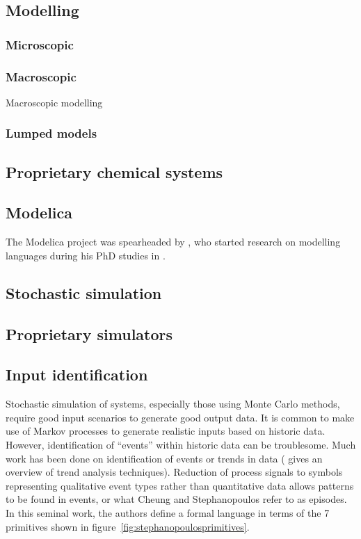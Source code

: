\subsection{Modelling}
\subsubsection{Microscopic}

\subsubsection{Macroscopic}
Macroscopic modelling 

\subsubsection{Lumped models}

\subsection{Proprietary chemical systems}

\subsection{Modelica}
The Modelica project was spearheaded by \xxx, who started research on
modelling languages during his PhD studies in \xxx.

\subsection{Stochastic simulation}

\subsection{Proprietary simulators}

\subsection{Input identification}
Stochastic simulation of systems, especially those using Monte Carlo
methods, require good input scenarios to generate good output data.
It is common to make use of Markov processes to generate realistic
inputs based on historic data.  However, identification of ``events''
within historic data can be troublesome.  Much work has been done on
identification of events or trends in data (\cite{Maurya2007Fault}
gives an overview of trend analysis techniques).  Reduction of process
signals to symbols representing qualitative event types rather than
quantitative data allows patterns to be found in events, or what
Cheung and Stephanopoulos \cite{Cheung1990Representation} refer to as
episodes.  In this seminal work, the authors define a formal language
in terms of the 7 primitives shown in
figure~\ref{fig:stephanopoulosprimitives}.

